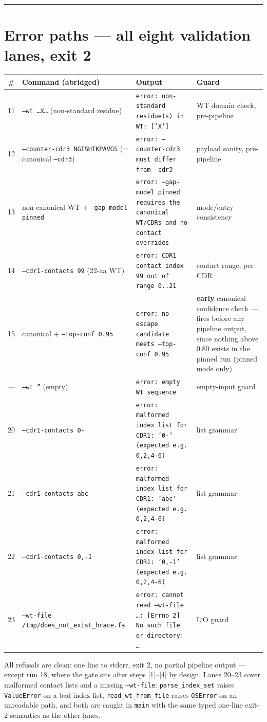 \documentclass{article}
\begin{document}
\hrule
\section{Error paths --- all eight validation lanes, exit 2}

\begin{longtable}{@{}p{}p{}p{}p{}@{}}
\toprule
\# & Command (abridged) & Output & Guard \\
\midrule
\endhead
11 & \texttt{--wt \dots X\dots} (non-standard residue) & \texttt{error: non-standard residue(s) in WT: ['X']} & WT domain check, pre-pipeline \\
12 & \texttt{--counter-cdr3 NGISHTKPAVGS} (= canonical \texttt{--cdr3}) & \texttt{error: --counter-cdr3 must differ from --cdr3} & payload sanity, pre-pipeline \\
13 & non-canonical WT + \texttt{--gap-model pinned} & \texttt{error: --gap-model pinned requires the canonical WT/CDRs and no contact overrides} & mode/entry consistency \\
14 & \texttt{--cdr1-contacts 99} (22-aa WT) & \texttt{error: CDR1 contact index 99 out of range 0..21} & contact range, per CDR \\
15 & canonical + \texttt{--top-conf 0.95} & \texttt{error: no escape candidate meets --top-conf 0.95} & \textbf{early} canonical confidence check --- fires before any pipeline output, since nothing above 0.80 exists in the pinned run (pinned mode only) \\
--- & \texttt{--wt ''} (empty) & \texttt{error: empty WT sequence} & empty-input guard \\
20 & \texttt{--cdr1-contacts 0-} & \texttt{error: malformed index list for CDR1: '0-' (expected e.g. 0,2,4-6)} & list grammar \\
21 & \texttt{--cdr1-contacts abc} & \texttt{error: malformed index list for CDR1: 'abc' (expected e.g. 0,2,4-6)} & list grammar \\
22 & \texttt{--cdr1-contacts 0,-1} & \texttt{error: malformed index list for CDR1: '0,-1' (expected e.g. 0,2,4-6)} & list grammar \\
23 & \texttt{--wt-file /tmp/does\_not\_exist\_hrace.fa} & \texttt{error: cannot read --wt-file \dots: [Errno 2] No such file or directory: \dots} & I/O guard \\
\bottomrule
\end{longtable}

All refusals are clean: one line to stderr, exit 2, no partial pipeline output
--- except run 18, where the gate sits after steps [1]--[4] by design. Lanes
20--23 cover malformed contact lists and a missing \texttt{--wt-file}:
\texttt{parse\_index\_set} raises \texttt{ValueError} on a bad index list,
\texttt{read\_wt\_from\_file} raises \texttt{OSError} on an unreadable path, and
both are caught in \texttt{main} with the same typed one-line exit-2 semantics as
the other lanes.
\end{document}
